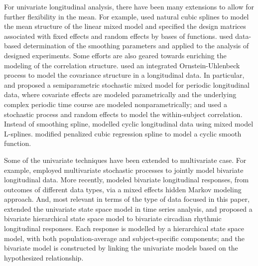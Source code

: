 \documentclass[article,lineno]{biometrika}
\begin{document}
For univariate longitudinal analysis,
there have  been many extensions to allow for further flexibility in the mean.  For example, 
\citet{Brumback:1998} used natural cubic splines to model the mean structure of the linear mixed model
and specified the design matrices associated with fixed effects and random effects by bases of functions.
\citet{Verb:Cull:Kenw:Welh:quan:1999} 
used data-based determination of the smoothing parameters and applied to the analysis of designed experiments. 
Some efforts are also geared towards enriching the modeling of the correlation structure.
\citet{Tayl:Cumb:Sy:quan:1994} used an integrated Ornstein-Uhlenbeck process to model the covariance structure in a longitudinal data.
In particular,
 \cite {Zhang:1998} and \citet{Zhan:Lin:Sowe:quan:2000}  proposed a  semiparametric stochastic mixed model for periodic longitudinal data, where   covariate effects are modeled parametrically and the underlying complex periodic time course are modeled nonparametrically; and used a stochastic process and random effects to model the within-subject correlation. Instead of  smoothing spline, \cite{Welh:Cull:Kenw:Thom:quan:2006} modelled cyclic longitudinal data using mixed model L-splines. 
\citet{Wood:2006} modified penalized cubic regression spline to model a cyclic smooth function. 

Some of the univariate techniques have been extended to multivariate case.
For example, 
\citet{Sy:Cumb:Tayl:quan:1997} employed multivariate stochastic processes to jointly model  bivariate longitudinal data. 
 More recently, \cite{Raffa:2015} modeled bivariate longitudinal responses, from outcomes of different data types, via a mixed effects hidden Markov modeling approach.  And, most relevant in terms of the type of data focused in this paper,  \cite{Liu:Capp:Crof:Guo:quan:2014} extended the univariate state space model in time series analysis, and proposed a bivariate hierarchical state space model to bivariate circadian rhythmic  longitudinal responses. 
Each response is modelled by a hierarchical state space model, with both population-average and subject-specific components; and the bivariate model is constructed by linking the univariate models based on the hypothesized relationship. 
\end{document}
